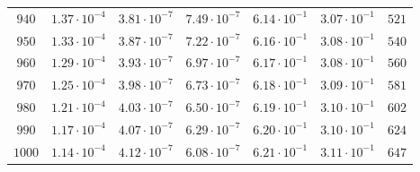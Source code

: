\begin{table}
\begin{tabular}{ccccccc}
$940 $&$ 1.37\cdot 10^{-4}  $&$ 3.81\cdot 10^{-7}  $&$ 7.49\cdot 10^{-7}  $&$ 6.14\cdot 10^{-1}  $&$ 3.07\cdot 10^{-1}  $&$ 521 $\\
$950 $&$ 1.33\cdot 10^{-4}  $&$ 3.87\cdot 10^{-7}  $&$ 7.22\cdot 10^{-7}  $&$ 6.16\cdot 10^{-1}  $&$ 3.08\cdot 10^{-1}  $&$ 540 $\\
$960 $&$ 1.29\cdot 10^{-4}  $&$ 3.93\cdot 10^{-7}  $&$ 6.97\cdot 10^{-7}  $&$ 6.17\cdot 10^{-1}  $&$ 3.08\cdot 10^{-1}  $&$ 560 $\\
$970 $&$ 1.25\cdot 10^{-4}  $&$ 3.98\cdot 10^{-7}  $&$ 6.73\cdot 10^{-7}  $&$ 6.18\cdot 10^{-1}  $&$ 3.09\cdot 10^{-1}  $&$ 581 $\\
$980 $&$ 1.21\cdot 10^{-4}  $&$ 4.03\cdot 10^{-7}  $&$ 6.50\cdot 10^{-7}  $&$ 6.19\cdot 10^{-1}  $&$ 3.10\cdot 10^{-1}  $&$ 602 $\\
$990 $&$ 1.17\cdot 10^{-4}  $&$ 4.07\cdot 10^{-7}  $&$ 6.29\cdot 10^{-7}  $&$ 6.20\cdot 10^{-1}  $&$ 3.10\cdot 10^{-1}  $&$ 624 $\\
$1000 $&$ 1.14\cdot 10^{-4}  $&$ 4.12\cdot 10^{-7}  $&$ 6.08\cdot 10^{-7}  $&$ 6.21\cdot 10^{-1}  $&$ 3.11\cdot 10^{-1} $&$ 647 $\\
\hline
  \end{tabular}
\end{table}

